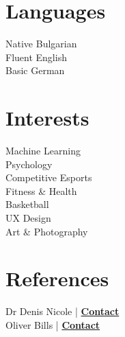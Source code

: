 \documentclass[]{resume}
\begin{document}
\begin{minipage}[t]{0.30\textwidth}
\sectionsep

\section{Languages}
Native Bulgarian\\
Fluent English\\
Basic German

\sectionsep

\section{Interests}

Machine Learning\\
Psychology\\
Competitive Esports\\
Fitness \& Health\\
Basketball\\
UX Design\\
Art \& Photography

\sectionsep
\section{References}

Dr Denis Nicole | \href{http://www.hpcc.ecs.soton.ac.uk/dan/}{\bf Contact}\\
Oliver Bills | \href{https://www.ecs.soton.ac.uk/people/ob1a12}{\bf Contact}

\end{minipage}
\end{document}
